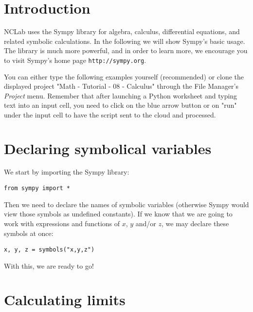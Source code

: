 \documentclass{article}
\begin{document}
\normalsize

\newpage
\setcounter{tocdepth}{2}
\tableofcontents

\newpage

\pagestyle{plain}
\setcounter{page}{1}


\newpage

\pagestyle{plain}


\section{Introduction}

NCLab uses the Sympy library for algebra, calculus, differential equations, and related 
symbolic calculations. In the following we will show Sympy's basic usage. The library 
is much more powerful, and in order to learn more, we encourage you to visit Sympy's
home page {\tt http://sympy.org}. 

You can either type the 
following examples yourself (recommended) or clone the displayed project 
"Math - Tutorial - 08 - Calculus" through the File Manager's
{\em Project} menu. Remember that after launching a Python worksheet and 
typing text into an input cell, you need to click on the blue arrow button 
or on "run" under the input cell to have the script sent to the cloud and 
processed.

\section{Declaring symbolical variables}

We start by importing the Sympy library:

\begin{verbatim}
from sympy import *
\end{verbatim}
Then we need to declare the names of symbolic variables (otherwise Sympy would 
view those symbols as undefined constants). If we know that we are going to work 
with expressions and functions of $x$, $y$ and/or $z$, we may declare these symbols 
at once:
\begin{verbatim}
x, y, z = symbols("x,y,z")
\end{verbatim}
With this, we are ready to go!

\section{Calculating limits}
\end{document}
